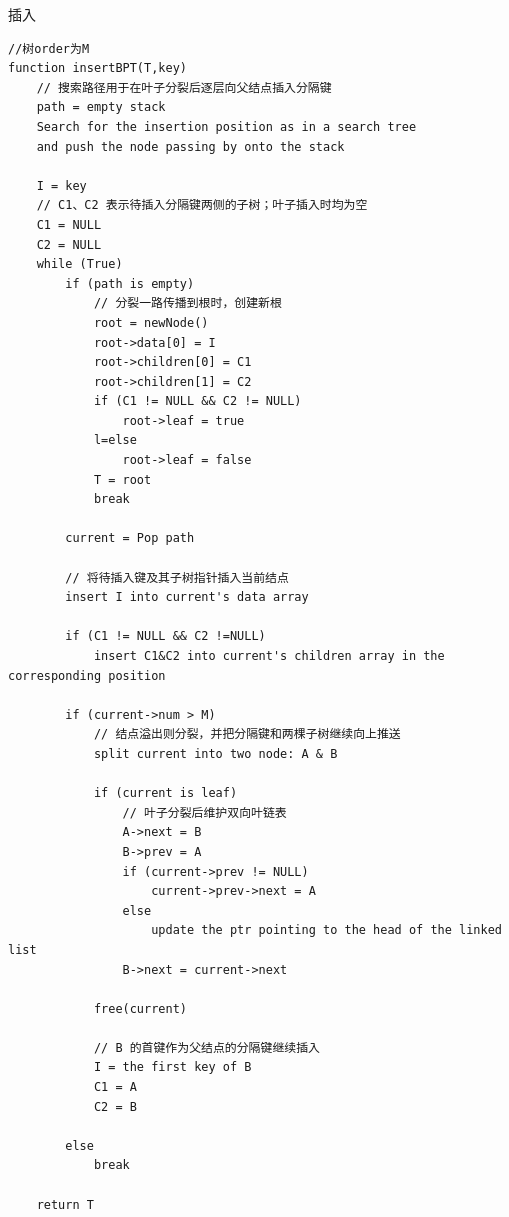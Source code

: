 \documentclass[openany]{book}
\begin{document}
插入
\begin{lstlisting}
//树order为M
function insertBPT(T,key)
    // 搜索路径用于在叶子分裂后逐层向父结点插入分隔键
    path = empty stack
    Search for the insertion position as in a search tree
    and push the node passing by onto the stack

    I = key
    // C1、C2 表示待插入分隔键两侧的子树；叶子插入时均为空
    C1 = NULL
    C2 = NULL
    while (True)
        if (path is empty)
            // 分裂一路传播到根时，创建新根
            root = newNode()
            root->data[0] = I
            root->children[0] = C1
            root->children[1] = C2
            if (C1 != NULL && C2 != NULL)
                root->leaf = true
            l=else
                root->leaf = false
            T = root
            break

        current = Pop path

        // 将待插入键及其子树指针插入当前结点
        insert I into current's data array

        if (C1 != NULL && C2 !=NULL)
            insert C1&C2 into current's children array in the corresponding position

        if (current->num > M)
            // 结点溢出则分裂，并把分隔键和两棵子树继续向上推送
            split current into two node: A & B

            if (current is leaf)     
                // 叶子分裂后维护双向叶链表
                A->next = B 
                B->prev = A 
                if (current->prev != NULL)
                    current->prev->next = A 
                else 
                    update the ptr pointing to the head of the linked list
                B->next = current->next

            free(current)

            // B 的首键作为父结点的分隔键继续插入
            I = the first key of B 
            C1 = A
            C2 = B

        else
            break

    return T
\end{lstlisting}
\end{document}
